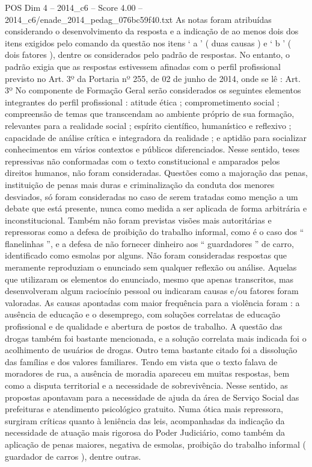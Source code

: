 \begin{textsample}{POS Dim 4 – 2014\_c6 – Score 4.00 – 2014\_c6/enade\_2014\_pedag\_076bc59f40.txt}
As notas foram atribuídas considerando o desenvolvimento da resposta e a indicação de ao menos dois dos itens exigidos pelo comando da questão nos itens ‘ a ’ ( duas causas ) e ‘ b ’ ( dois fatores ), dentre os considerados pelo padrão de respostas.
No entanto, o padrão exigia que as respostas estivessem afinadas com o perfil profissional previsto no Art. 3º da Portaria nº 255, de 02 de junho de 2014, onde se lê : Art. 3º No componente de Formação Geral serão considerados os seguintes elementos integrantes do perfil profissional : atitude ética ; comprometimento social ; compreensão de temas que transcendam ao ambiente próprio de sua formação, relevantes para a realidade social ; espírito científico, humanístico e reflexivo ; capacidade de análise crítica e integradora da realidade ; e aptidão para socializar conhecimentos em vários contextos e públicos diferenciados.
Nesse sentido, teses repressivas não conformadas com o texto constitucional e amparados pelos direitos humanos, não foram consideradas.
Questões como a majoração das penas, instituição de penas mais duras e criminalização da conduta dos menores desviados, só foram consideradas no caso de serem tratadas como menção a um debate que está presente, nunca como medida a ser aplicada de forma arbitrária e inconstitucional.
Também não foram previstas visões mais autoritárias e repressoras como a defesa de proibição do trabalho informal, como é o caso dos “ flanelinhas ”, e a defesa de não fornecer dinheiro aos “ guardadores ” de carro, identificado como esmolas por alguns.
Não foram consideradas respostas que meramente reproduziam o enunciado sem qualquer reflexão ou análise.
Aquelas que utilizaram os elementos do enunciado, mesmo que apenas transcritos, mas desenvolveram algum raciocínio pessoal ou indicaram causas e/ou fatores foram valoradas.
As causas apontadas com maior frequência para a violência foram : a ausência de educação e o desemprego, com soluções correlatas de educação profissional e de qualidade e abertura de postos de trabalho.
A questão das drogas também foi bastante mencionada, e a solução correlata mais indicada foi o acolhimento de usuários de drogas.
Outro tema bastante citado foi a dissolução das famílias e dos valores familiares.
Tendo em vista que o texto falava de moradores de rua, a ausência de moradia apareceu em muitas respostas, bem como a disputa territorial e a necessidade de sobrevivência.
Nesse sentido, as propostas apontavam para a necessidade de ajuda da área de Serviço Social das prefeituras e atendimento psicológico gratuito.
Numa ótica mais repressora, surgiram críticas quanto à leniência das leis, acompanhadas da indicação da necessidade de atuação mais rigorosa do Poder Judiciário, como também da aplicação de penas maiores, negativa de esmolas, proibição do trabalho informal ( guardador de carros ), dentre outras.

\end{textsample}
